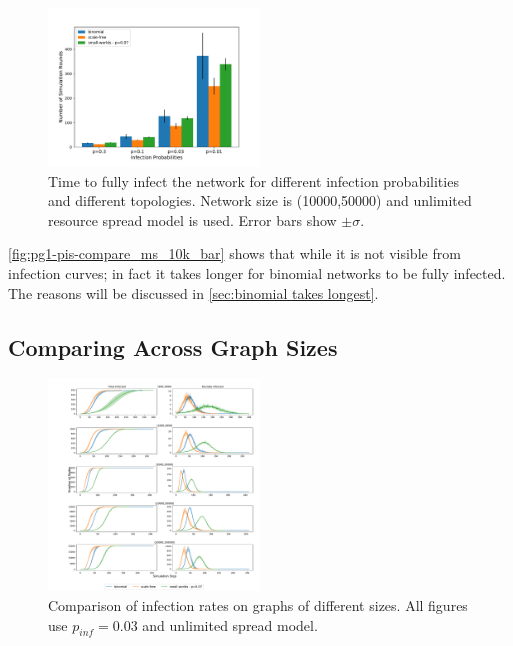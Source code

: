 \documentclass[conference]{IEEEtran}
\begin{document}
\begin{figure}[htb]
  \begin{center}
	\includegraphics[width=0.5\textwidth]{img/pg1-pis-compare_ms_10k_bar.pdf}
  \end{center}
	\caption{Time to fully infect the network for different infection probabilities and different topologies. Network size is (10000,50000) and unlimited resource spread model is used. Error bars show $\pm \sigma$.}
	\label{fig:pg1-pis-compare_ms_10k_bar}
\end{figure}

\autoref{fig:pg1-pis-compare_ms_10k_bar} shows that while it is not visible from infection curves; in fact it takes longer for binomial networks to be fully infected. The reasons will be discussed in \autoref{sec:binomial takes longest}.

\subsection{Comparing Across Graph Sizes}


\begin{figure}[htb]
  \begin{center}
	\includegraphics[width=0.5\textwidth]{img/pg1-sizes-compare_ms_p003.pdf}
  \end{center}
	\caption{Comparison of infection rates on graphs of different sizes. All figures use $p_{inf} = 0.03$ and unlimited spread model.}
	\label{fig:pg1-sizes-compare_ms_p003}
\end{figure}
\end{document}

